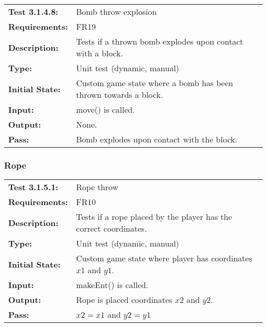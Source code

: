 \documentclass[12pt, titlepage]{article}
\begin{document}
\begin{tabular}{|l|p{10cm}|}
    \hline
    \bf{Test} 3.1.4.8: & Bomb throw explosion \\
    \bf{Requirements}: & FR19 \\
    \bf{Description}: & Tests if a thrown bomb explodes upon contact with a block. \\
    \bf{Type}: & Unit test (dynamic, manual) \\
    \bf{Initial State}: & Custom game state where a bomb has been thrown towards a block. \\
    \bf{Input}: & move() is called. \\
    \bf{Output}: & None. \\
    \bf{Pass}: & Bomb explodes upon contact with the block. \\
    \hline
\end{tabular}


\subsubsection{Rope}

\begin{tabular}{|l|p{10cm}|}
    \hline
    \bf{Test} 3.1.5.1: & Rope throw \\
    \bf{Requirements}: & FR10 \\
    \bf{Description}: & Tests if a rope placed by the player has the correct coordinates. \\
    \bf{Type}: & Unit test (dynamic, manual) \\
    \bf{Initial State}: & Custom game state where player has coordinates $x1$ and $y1$. \\
    \bf{Input}: & makeEnt() is called. \\
    \bf{Output}: & Rope is placed coordinates $x2$ and $y2$. \\
    \bf{Pass}: & $x2 = x1$ and $y2 = y1$ \\
    \hline
\end{tabular}
\end{document}
